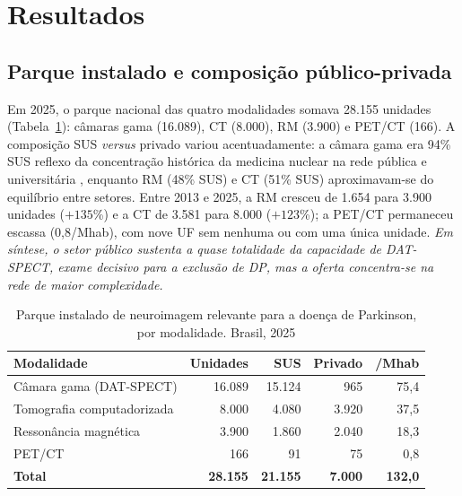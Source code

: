 \documentclass[12pt,a4paper,oneside]{article}
\begin{document}
\section{Resultados}

\subsection{Parque instalado e composição público-privada}

Em 2025, o parque nacional das quatro modalidades somava 28.155
unidades (Tabela~\ref{tab:agregado}): câmaras gama (16.089), CT
(8.000), RM (3.900) e PET/CT (166). A composição SUS \textit{versus}
privado variou acentuadamente: a câmara gama era 94\% SUS \textemdash{}
reflexo da concentração histórica da medicina nuclear na rede pública
e universitária \textemdash{}, enquanto RM (48\% SUS) e CT (51\% SUS)
aproximavam-se do equilíbrio entre setores. Entre 2013 e 2025, a RM
cresceu de 1.654 para 3.900 unidades ($+135$\%) e a CT de 3.581 para
8.000 ($+123$\%); a PET/CT permaneceu escassa (0,8/Mhab), com nove UF
sem nenhuma ou com uma única unidade. \textit{Em síntese, o setor
público sustenta a quase totalidade da capacidade de DAT-SPECT, exame
decisivo para a exclusão de DP, mas a oferta concentra-se na rede de
maior complexidade.}

\begin{table}[htbp]
\centering
\caption{Parque instalado de neuroimagem relevante para a doença de
Parkinson, por modalidade. Brasil, 2025}
\begin{tabular}{lrrrr}
\toprule
\textbf{Modalidade} & \textbf{Unidades} & \textbf{SUS} & \textbf{Privado} & \textbf{/Mhab} \\
\midrule
Câmara gama (DAT-SPECT)      & 16.089 & 15.124 & 965   & 75,4 \\
Tomografia computadorizada   &  8.000 &  4.080 & 3.920 & 37,5 \\
Ressonância magnética        &  3.900 &  1.860 & 2.040 & 18,3 \\
PET/CT                       &    166 &     91 &    75 &  0,8 \\
\midrule
\textbf{Total}               & \textbf{28.155} & \textbf{21.155} & \textbf{7.000} & \textbf{132,0} \\
\bottomrule
\end{tabular}
\par{}
\label{tab:agregado}
\end{table}
\end{document}
